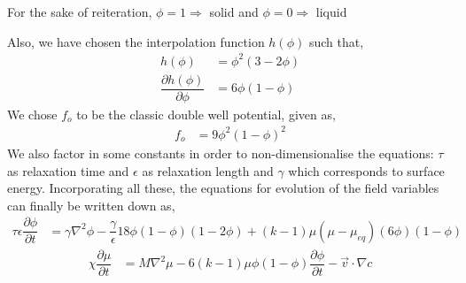 \documentclass[12pt,a4paper]{report}
\begin{document}
For the sake of reiteration,
$\phi = 1 \Longrightarrow$ solid and $\phi = 0 \Longrightarrow$ liquid

Also, we have chosen the interpolation function $h(\phi)$ such that,
\begin{align}
	h(\phi) &= \phi^2\left(3 - 2 \phi\right) \\
	\dfrac{\partial h(\phi)}{\partial \phi} &= 6\phi\left(1-\phi\right)
	\label{interpolation functions}
\end{align}
We chose $f_o$ to be the classic double well potential, given as,
\begin{align}
	f_o &= 9\phi^2\left(1-\phi\right)^2
\end{align}
We also factor in some constants in order to non-dimensionalise the equations: $\tau$ as relaxation
time and $\epsilon$ as relaxation length and $\gamma$ which corresponds to surface energy.
Incorporating all these, the equations for evolution of the field variables can finally be written down as,
\begin{align}
\tau\epsilon\dfrac{\partial\phi}{\partial t} &= \gamma\nabla^{2}\phi -\dfrac{\gamma}{\epsilon}18\phi(1-\phi)(1-2\phi)
					+(k - 1)\mu\left(\mu-\mu_{eq}\right)(6\phi)\left(1-\phi\right)
\label{phi}
\end{align}
\begin{align}
		\chi \dfrac{\partial \mu}{\partial t} &=  M\nabla^2\mu 
	- 6\left(k-1\right)\mu\phi\left(1-\phi\right)\dfrac{\partial\phi}{\partial t}- \vec{v}\cdot\nabla c
\label{mu}
\end{align}
\end{document}
